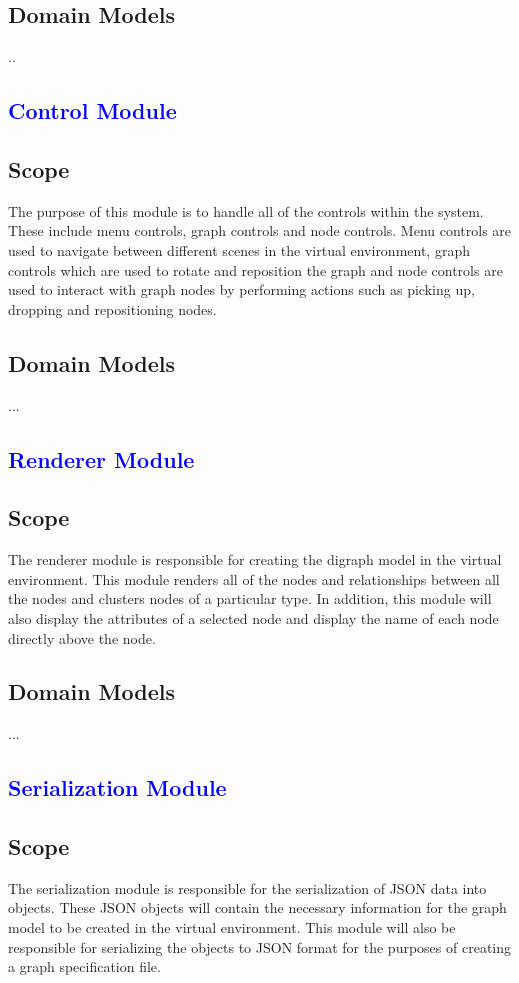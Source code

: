 \documentclass[12pt]{article}
\begin{document}
\subsection{Domain Models}
..
\textcolor{blue}{\section{Control Module}}
\subsection{Scope}
The purpose of this module is to handle all of the controls within the system. These include menu controls, graph controls and node controls. Menu controls are used to navigate between different scenes in the virtual environment, graph controls which are used to rotate and reposition the graph and node controls are used to interact with graph nodes by performing actions such as picking up, dropping and repositioning nodes. 
\subsection{Domain Models}
...
\textcolor{blue}{\section{Renderer Module}}
\subsection{Scope}
The renderer module is responsible for creating the digraph model in the virtual environment. This module renders all of the nodes and relationships between all the nodes and clusters nodes of a particular type. In addition, this module will also display the attributes of a selected node and display the name of each node directly above the node. 
\subsection{Domain Models}
...
\textcolor{blue}{\section{Serialization Module}}
\subsection{Scope}
The serialization module is responsible for the serialization of JSON data into objects. These JSON objects will contain the necessary information for the graph model to be created in the virtual environment. This module will also be responsible for serializing the objects to JSON format for the purposes of creating a graph specification file. 
\end{document}
